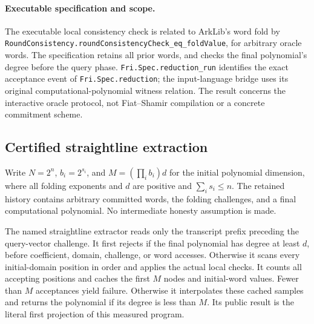 \paragraph{Executable specification and scope.}
The executable local consistency check is related to ArkLib's word fold by
\texttt{RoundConsistency.roundConsistencyCheck\_eq\_foldValue}, for arbitrary
oracle words. The specification retains all prior words, and checks the final
polynomial's degree before the query phase.
\texttt{Fri.Spec.reduction\_run} identifies the exact acceptance event of
\texttt{Fri.Spec.reduction}; the input-language bridge uses its original
computational-polynomial witness relation. The result concerns the interactive
oracle protocol, not Fiat--Shamir compilation or a concrete commitment scheme.

\subsection{Certified straightline extraction}

Write $N=2^n$, $b_i=2^{s_i}$, and $M=(\prod_i b_i)d$ for the initial
polynomial dimension, where all folding exponents and $d$ are positive and
$\sum_i s_i\leq n$.
The retained history contains arbitrary committed words, the folding challenges,
and a final computational polynomial. No intermediate honesty assumption is made.

\begin{definition}\label{def:fri-measured-extractor}
\leanok
The named straightline extractor reads only the transcript prefix preceding the
query-vector challenge. It first rejects if the final polynomial has degree at
least $d$, before coefficient, domain, challenge, or word accesses. Otherwise it
scans every initial-domain position in order and applies the actual local checks.
It counts all accepting positions and caches the first $M$ nodes and initial-word
values. Fewer than $M$ acceptances yield failure. Otherwise it interpolates these
cached samples and returns the polynomial if its degree is less than $M$.
Its public result is the literal first projection of this measured program.
\end{definition}

